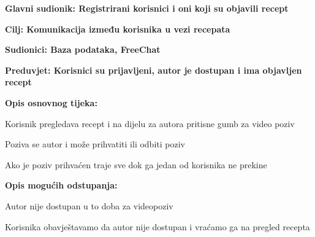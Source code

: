 	\noindent {}
	\begin{packed_item}
		
		\item \textbf{Glavni sudionik: Registrirani korisnici i oni koji su objavili recept }
		\item  \textbf{Cilj: Komunikacija između korisnika u vezi recepata} 
		\item  \textbf{Sudionici: Baza podataka, FreeChat} 
		\item  \textbf{Preduvjet: Korisnici su prijavljeni, autor je dostupan i ima objavljen recept} 
		\item  \textbf{Opis osnovnog tijeka:}
		
		\item[] \begin{packed_enum}
			
			\item Korisnik pregledava recept i na dijelu za autora pritisne gumb za video poziv
			\item Poziva se autor i može prihvatiti ili odbiti poziv
			\item Ako je poziv prihvaćen traje sve dok ga jedan od korisnika ne prekine
		\end{packed_enum}
		
		\item  \textbf{Opis mogućih odstupanja:}
		
		\item[] \begin{packed_item}
			
			\item[2.a] Autor nije dostupan u to doba za videopoziv
			\item[] \begin{packed_enum}
				
				\item Korisnika obavještavamo da autor nije dostupan i vraćamo ga na pregled recepta
				
			\end{packed_enum}
			
		\end{packed_item}
	\end{packed_item}
	
	
	
